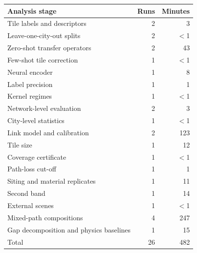 \begin{tabular}{lrr}
\toprule
Analysis stage & Runs & Minutes \\
\midrule
Tile labels and descriptors & 2 & 3 \\
Leave-one-city-out splits & 2 & $<$1 \\
Zero-shot transfer operators & 2 & 43 \\
Few-shot tile correction & 1 & $<$1 \\
Neural encoder & 1 & 8 \\
Label precision & 1 & 1 \\
Kernel regimes & 1 & $<$1 \\
Network-level evaluation & 2 & 3 \\
City-level statistics & 1 & $<$1 \\
Link model and calibration & 2 & 123 \\
Tile size & 1 & 12 \\
Coverage certificate & 1 & $<$1 \\
Path-loss cut-off & 1 & 1 \\
Siting and material replicates & 1 & 11 \\
Second band & 1 & 14 \\
External scenes & 1 & $<$1 \\
Mixed-path compositions & 4 & 247 \\
Gap decomposition and physics baselines & 1 & 15 \\
\midrule
Total & 26 & 482 \\
\bottomrule
\end{tabular}
